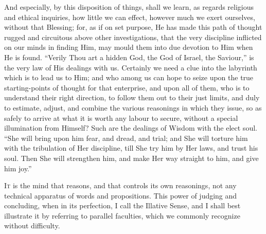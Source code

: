 And especially, by this disposition of things, shall we learn, as
regards religious and ethical inquiries, how little we can effect,
however much we exert ourselves, without that Blessing; for, as if on
set purpose, He has made this path of thought rugged and circuitous
above other investigations, that the very discipline inflicted on our
minds in finding Him, may mould them into due devotion to Him when He
is found. ``Verily Thou art a hidden God, the God of Israel, the
Saviour,'' is the very law of His dealings with us. Certainly we
need a clue into the labyrinth which is to lead us to Him; and who
among us can hope to seize upon the true starting-points of thought
for that enterprise, and upon all of them, who is to understand their
right direction, to follow them out to their just limits, and duly to
estimate, adjust, and combine the various reasonings in which they
issue, so as safely to arrive at what it is worth any labour to
secure, without a special illumination from Himself? Such are the
dealings of Wisdom with the elect soul. ``She will bring upon him
fear, and dread, and trial; and She will torture him with the
tribulation of Her discipline, till She try him by Her laws, and trust
his soul. Then She will strengthen him, and make Her way straight to
him, and give him joy.''


I\textsc{t} is the mind that reasons, and that controls its own reasonings,
not any technical apparatus of words and propositions. This power of
judging and concluding, when in its perfection, I call the Illative
Sense, and I shall best illustrate it by referring to parallel
faculties, which we commonly recognize without difficulty.

